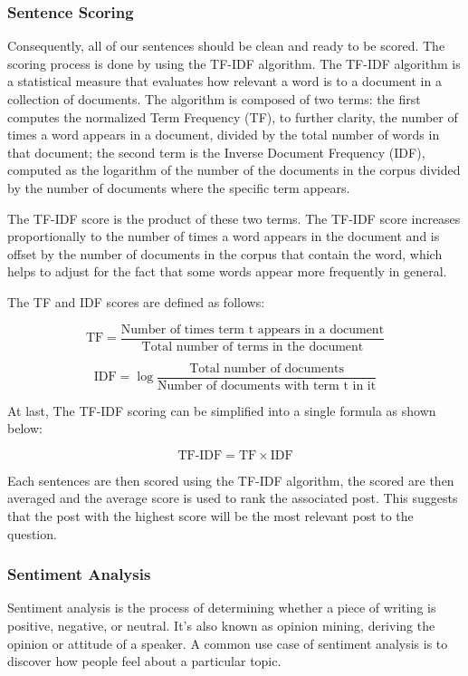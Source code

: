 \subsubsection{Sentence Scoring} \label{sssec:preprocessing_sentence_scoring}
Consequently, all of our sentences should be clean and ready to be scored. The scoring process is done by using the TF-IDF algorithm. The TF-IDF algorithm is a statistical measure that evaluates how relevant a word is to a document in a collection of documents. The algorithm is composed of two terms: the first computes the normalized Term Frequency (TF), to further clarity, the number of times a word appears in a document, divided by the total number of words in that document; the second term is the Inverse Document Frequency (IDF), computed as the logarithm of the number of the documents in the corpus divided by the number of documents where the specific term appears.

The TF-IDF score is the product of these two terms. The TF-IDF score increases proportionally to the number of times a word appears in the document and is offset by the number of documents in the corpus that contain the word, which helps to adjust for the fact that some words appear more frequently in general.

The TF and IDF scores are defined as follows:

\begin{equation}
\label{eq:tf}
\text{TF} = \frac{\text{Number of times term t appears in a document}}{\text{Total number of terms in the document}}
\end{equation}

\begin{equation}
\label{eq:idf}
\text{IDF} = \log{\frac{\text{Total number of documents}}{\text{Number of documents with term t in it}}}
\end{equation}

At last, The TF-IDF scoring can be simplified into a single formula as shown below:

\begin{equation}
\label{eq:tfidf}
\text{TF-IDF} = \text{TF} \times \text{IDF}
\end{equation}

Each sentences are then scored using the TF-IDF algorithm, the scored are then averaged and the average score is used to rank the associated post. This suggests that the post with the highest score will be the most relevant post to the question.

\pagebreak
\subsubsection{Sentiment Analysis} \label{sssec:preprocessing_sentiment_analysis}
Sentiment analysis is the process of determining whether a piece of writing is positive, negative, or neutral. It's also known as opinion mining, deriving the opinion or attitude of a speaker. A common use case of sentiment analysis is to discover how people feel about a particular topic.

